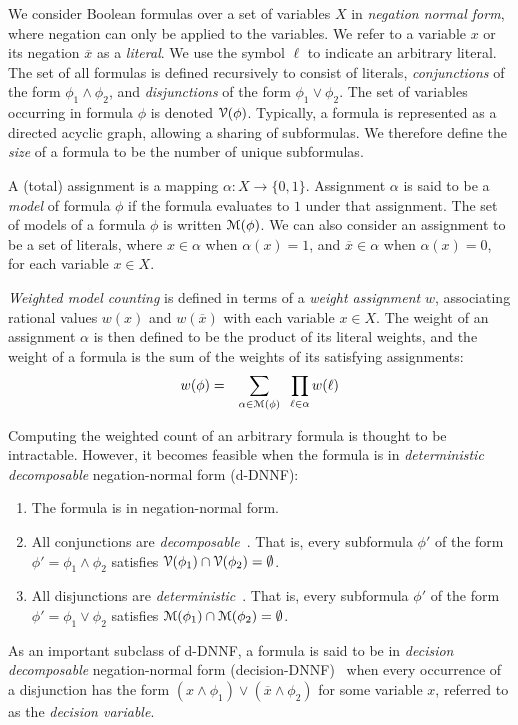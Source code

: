 \documentclass[letterpaper,USenglish,cleveref, autoref, thm-restate]{lipics-v2021}
\newcommand{\obar}[1]{\overline{#1}}
\newcommand{\lit}{\ell}
\newcommand{\varset}{X}
\newcommand{\dependencyset}{{\cal V}}
\newcommand{\assign}{\alpha}
\newcommand{\modelset}{{\cal M}}
\begin{document}
We consider Boolean formulas over a set of variables $\varset$ in
\emph{negation normal form}, where negation can only be applied to the
variables.  We refer to a variable $x$ or its negation $\obar{x}$ as a
\emph{literal}.  We use the symbol $\lit$ to indicate an arbitrary
literal.  The set of all formulas is defined recursively to consist of
literals, \emph{conjunctions} of the form $\phi_1 \land \phi_2$, and
\emph{disjunctions} of the form $\phi_1 \lor \phi_2$.  The set of
variables occurring in formula $\phi$ is denoted
$\dependencyset(\phi)$.  Typically, a formula is represented as a
directed acyclic graph, allowing a sharing of subformulas.  We
therefore define the \emph{size} of a formula to be the number of
unique subformulas.

A (total) assignment is a mapping $\assign \colon \varset \rightarrow
\{0, 1\}$.  Assignment $\assign$ is said to be a \emph{model} of
formula $\phi$ if the formula evaluates to $1$ under that assignment.
The set of models of a formula $\phi$ is written $\modelset(\phi)$.
We can also consider an assignment to be a set of literals, where $x \in \assign$
when $\assign(x) = 1$, and $\obar{x} \in \assign$ when
$\assign(x) = 0$, for each variable $x \in \varset$.

\emph{Weighted model counting} is defined in terms of a \emph{weight
  assignment} $w$, associating rational values $w(x)$ and
$w(\obar{x})$ with each variable $x \in \varset$.
The weight of an
assignment $\assign$ is then defined to be the product of its literal weights, and the weight
of a formula is the sum of the weights of its satisfying assignments:
\begin{eqnarray}
  w(\phi) & = & \sum_{\assign \in \modelset(\phi)} \;\;\prod_{\lit \in \assign} w(\lit) \label{eqn:wmc}
\end{eqnarray}

Computing the weighted count of an arbitrary formula is thought to be intractable.  However, it becomes
feasible when the formula is in \emph{deterministic decomposable} negation-normal form (d-DNNF):
\begin{enumerate}
\item The formula is in negation-normal form.  
\item All conjunctions are \emph{decomposable}~\cite{darwiche:jacm:2001,darwiche:jair:2002}.  That is, every subformula $\phi'$ of the form $\phi' = \phi_1 \land \phi_2$
  satisfies $\dependencyset(\phi_1) \cap \dependencyset(\phi_2) = \emptyset$.
\item All disjunctions are \emph{deterministic}~\cite{darwiche:jancl:2001,darwiche:jair:2002}.  That is, every subformula $\phi'$ of the form $\phi' =\phi_1 \lor \phi_2$ satisfies
  $\modelset(\phi_1) \cap \modelset(\phi_2) = \emptyset$.
\end{enumerate}
As an important subclass of d-DNNF, a formula is said to be in 
\emph{decision decomposable} negation-normal form (decision-DNNF)~\cite{huang:jair:2007} when every occurrence of a disjunction has the form 
$(x \land \phi_1) \lor (\obar{x} \land \phi_2)$ for some variable $x$, referred to as the \emph{decision variable}.
\end{document}
